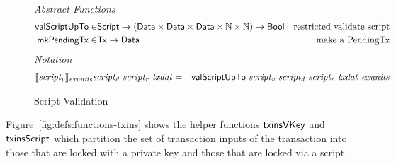 \begin{figure*}[htb]
  \emph{Abstract Functions}
  \begin{align*}
    \mathsf{valScriptUpTo} \in & \mathsf{Script}\to (\mathsf{Data} \times \mathsf{Data} \times \mathsf{Data} \times \mathbb{N} \times \mathbb{N})
    \to\mathsf{Bool} & \text{restricted validate script} \\
    \mathsf{mkPendingTx} \in & \mathsf{Tx}\to \mathsf{Data}
     & \text{make a PendingTx} \\
  \end{align*}
  \emph{Notation}
  \begin{align*}
    \llbracket \mathit{script_v} \rrbracket_{\mathit{exunits}} \mathit{script_d}~\mathit{script_r}~\mathit{txdat}
    &=& \mathsf{valScriptUpTo} ~\mathit{script_v} ~ \mathit{script_d}~\mathit{script_r}~\mathit{txdat}~
    \mathit{exunits}
  \end{align*}
  \caption{Script Validation}
  \label{fig:defs:functions-valid}
\end{figure*}

Figure~\ref{fig:defs:functions-txins} shows the helper functions
$\mathsf{txinsVKey}$ and $\mathsf{txinsScript}$ which partition the set of transaction
inputs of the transaction into those that are locked with a private key and
those that are locked via a script.

\clearpage
